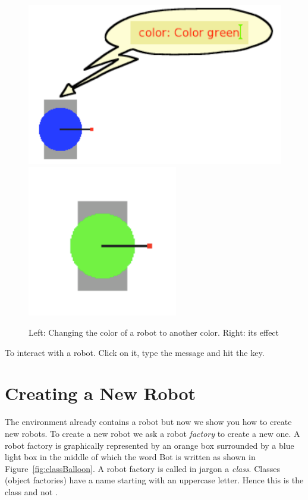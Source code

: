 \begin{figure}[!h]\centerline{\includegraphics{colorGreen2} \hfill\includegraphics{green2}}
\caption{Left: Changing the color of a robot to another color. Right: its effect \label{fig:green}}
\end{figure}


\begin{largecadre}{To interact with a robot. Click on it, type the message and hit the  key.}
\end{largecadre}

\section{Creating a New Robot}
The environment already contains a robot but now we show you how to create new robots. To create a new robot we ask a robot \emph{factory} to create a new one. A robot factory is graphically represented by an orange box surrounded by a blue light box in the middle of which the word Bot is written as shown in Figure~\ref{fig:classBalloon}. A robot factory  is called in \sq jargon a  \emph{class}.
Classes (object factories) have a name starting with an uppercase letter. Hence this is the class  and not .  

